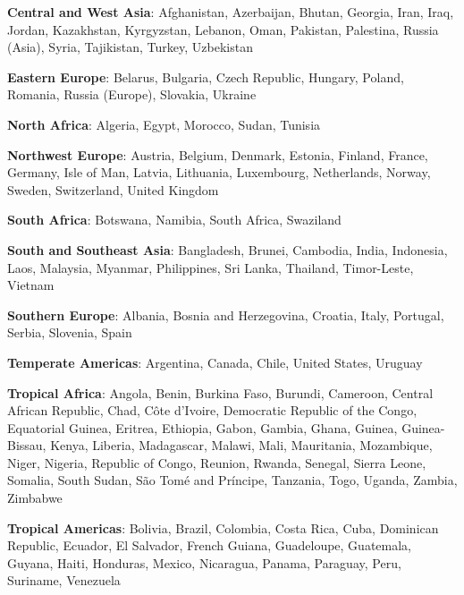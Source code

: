 \item \textbf{Central and West Asia}: Afghanistan, Azerbaijan, Bhutan, Georgia, Iran, Iraq, Jordan, Kazakhstan, Kyrgyzstan, Lebanon, Oman, Pakistan, Palestina, Russia (Asia), Syria, Tajikistan, Turkey, Uzbekistan
\item \textbf{Eastern Europe}: Belarus, Bulgaria, Czech Republic, Hungary, Poland, Romania, Russia (Europe), Slovakia, Ukraine
\item \textbf{North Africa}: Algeria, Egypt, Morocco, Sudan, Tunisia
\item \textbf{Northwest Europe}: Austria, Belgium, Denmark, Estonia, Finland, France, Germany, Isle of Man, Latvia, Lithuania, Luxembourg, Netherlands, Norway, Sweden, Switzerland, United Kingdom
\item \textbf{South Africa}: Botswana, Namibia, South Africa, Swaziland
\item \textbf{South and Southeast Asia}: Bangladesh, Brunei, Cambodia, India, Indonesia, Laos, Malaysia, Myanmar, Philippines, Sri Lanka, Thailand, Timor-Leste, Vietnam
\item \textbf{Southern Europe}: Albania, Bosnia and Herzegovina, Croatia, Italy, Portugal, Serbia, Slovenia, Spain
\item \textbf{Temperate Americas}: Argentina, Canada, Chile, United States, Uruguay
\item \textbf{Tropical Africa}: Angola, Benin, Burkina Faso, Burundi, Cameroon, Central African Republic, Chad, Côte d'Ivoire, Democratic Republic of the Congo, Equatorial Guinea, Eritrea, Ethiopia, Gabon, Gambia, Ghana, Guinea, Guinea-Bissau, Kenya, Liberia, Madagascar, Malawi, Mali, Mauritania, Mozambique, Niger, Nigeria, Republic of Congo, Reunion, Rwanda, Senegal, Sierra Leone, Somalia, South Sudan, São Tomé and Príncipe, Tanzania, Togo, Uganda, Zambia, Zimbabwe
\item \textbf{Tropical Americas}: Bolivia, Brazil, Colombia, Costa Rica, Cuba, Dominican Republic, Ecuador, El Salvador, French Guiana, Guadeloupe, Guatemala, Guyana, Haiti, Honduras, Mexico, Nicaragua, Panama, Paraguay, Peru, Suriname, Venezuela

